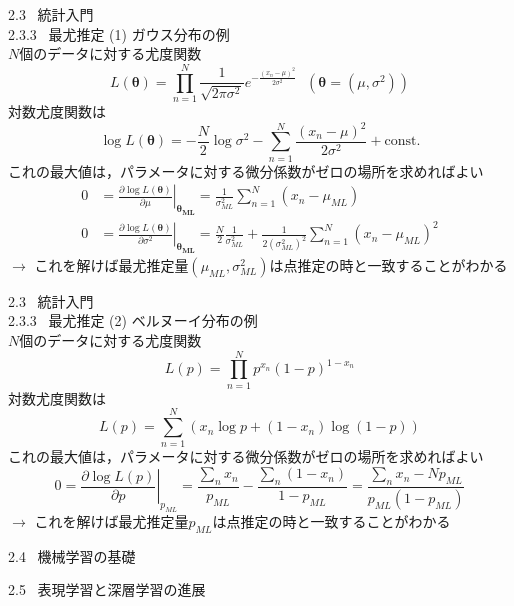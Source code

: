 \documentclass[dvipdfmx,10pt]{beamer}
\begin{document}
  \begin{frame}[t]{2.3 \ 統計入門 \\ \normalsize{2.3.3 \ 最尤推定}}
    (1) ガウス分布の例\\
    $N$個のデータに対する尤度関数
    \begin{equation*}
      L(\bm{\theta}) = \prod_{n=1}^{N}\frac{1}{\sqrt{2\pi\sigma^2}}e^{-\frac{(x_n - \mu)^2}{2\sigma^2}} \ \ \ (\bm{\theta}=(\mu,\sigma^2))
    \end{equation*}
    対数尤度関数は
    \begin{equation*}
      \log L(\bm{\theta}) = -\frac{N}{2}\log \sigma^2 -\sum_{n=1}^{N}\frac{(x_n-\mu)^2}{2\sigma^2}+\text{const.}
    \end{equation*}
    これの最大値は，パラメータに対する微分係数がゼロの場所を求めればよい
    \begin{align*}
      0 &= \left.\frac{\partial \log L(\bm{\theta})}{\partial \mu}\right|_{\bm{\theta_{ML}}} = \frac{1}{\sigma^2_{ML}}\sum_{n=1}^{N}(x_n - \mu_{ML})\\
      0 &= \left.\frac{\partial \log L(\bm{\theta})}{\partial \sigma^2}\right|_{\bm{\theta_{ML}}} = \frac{N}{2}\frac{1}{\sigma^2_{ML}} + \frac{1}{2(\sigma^2_{ML})^2}\sum_{n=1}^{N}(x_n - \mu_{ML})^2 
    \end{align*}
    $\rightarrow$ これを解けば最尤推定量$(\mu_{ML},\sigma^2_{ML})$は点推定の時と一致することがわかる
  \end{frame}

  \begin{frame}[t]{2.3 \ 統計入門 \\ \normalsize{2.3.3 \ 最尤推定}}
    (2) ベルヌーイ分布の例\\
    $N$個のデータに対する尤度関数
    \begin{equation*}
      L(p) = \prod_{n=1}^{N}p^{x_n}(1-p)^{1-x_n}
    \end{equation*}
    対数尤度関数は
    \begin{equation*}
      L(p) = \sum_{n=1}^{N}(x_n \log p+(1-x_n)\log (1-p))
    \end{equation*}
    これの最大値は，パラメータに対する微分係数がゼロの場所を求めればよい
    \begin{equation*}
      0 = \left.\frac{\partial \log L(p)}{\partial p}\right|_{p_{ML}} = \frac{\sum_n x_n}{p_{ML}}-\frac{\sum_n (1-x_n)}{1-p_{ML}} = \frac{\sum_n x_n - Np_{ML}}{p_{ML}(1-p_{ML})}
    \end{equation*}
    $\rightarrow$ これを解けば最尤推定量$p_{ML}$は点推定の時と一致することがわかる
  \end{frame}

  \begin{frame}{2.4 \ 機械学習の基礎}
    

  \end{frame}

  \begin{frame}{2.5 \ 表現学習と深層学習の進展}
    
  \end{frame}
\end{document}
